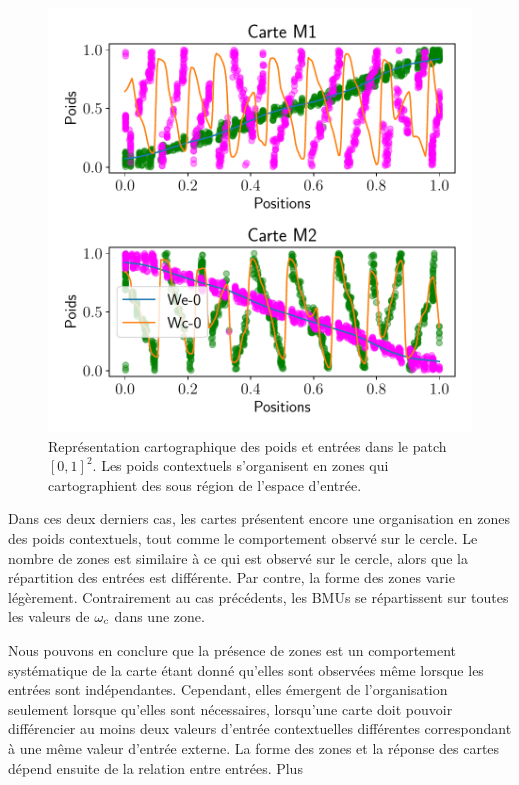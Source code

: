 \documentclass[../main]{subfiles}
\begin{document}
\begin{figure}[h!]
	\centering\includegraphics[width=\textwidth]{2som_square_w.pdf}
	\caption{Représentation cartographique des poids et entrées dans le patch $[0,1]^2$. Les poids contextuels s'organisent en zones qui cartographient des sous région de l'espace d'entrée. \label{fig:ind}}
\end{figure}

Dans ces deux derniers cas, les cartes présentent encore une organisation en zones des poids contextuels, tout comme le comportement observé sur le cercle. 
Le nombre de zones est similaire à ce qui est observé sur le cercle, alors que la répartition des entrées est différente. Par contre, la forme des zones varie légèrement.
Contrairement au cas précédents, les BMUs se répartissent sur toutes les valeurs de $\omega_c$ dans une zone.

Nous pouvons en conclure que la présence de zones est un comportement systématique de la carte étant donné qu'elles sont observées même lorsque les entrées sont indépendantes. 
Cependant, elles émergent de l'organisation seulement lorsque qu'elles sont nécessaires, lorsqu'une carte doit pouvoir différencier au moins deux valeurs d'entrée contextuelles différentes correspondant à une même valeur d'entrée externe.
La forme des zones et la réponse des cartes dépend ensuite de la relation entre entrées. Plus
\end{document}
